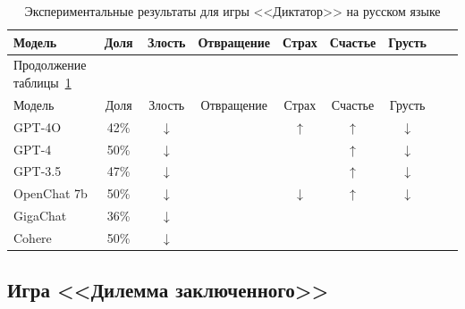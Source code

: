 \begin{longtable}[c]{|p{3.8cm}|c|c|c|c|c|c|c|c|}
\caption{Экспериментальные результаты для игры <<Диктатор>> на русском языке}
\label{tab:bargaining-ru}
    \\
    \hline
Модель & Доля & Злость & Отвращение & Страх  & Счастье & Грусть \\ \hline
    \endfirsthead   
    \multicolumn{2}{l}{\hspace{-2mm}Продолжение таблицы~\ref{tab:bargaining-ru}}        \\ %
\hline

Модель & Доля & Злость & Отвращение & Страх  & Счастье & Грусть \\ \hline \endhead        \hline %
    \endfoot        \hline
    \endlastfoot

GPT-4O & 42\% & $\downarrow$ & \bluearrow{$\downarrow$} & $\uparrow$ & $\uparrow$ & $\downarrow$ \\ \hline
GPT-4 & 50\% & $\downarrow$ & \bluearrow{$\downarrow$} & \bluearrow{$\uparrow$} & $\uparrow$ & $\downarrow$ \\ \hline

GPT-3.5 & 47\% & $\downarrow$ & \bluearrow{$\downarrow$} & \bluearrow{$\uparrow$} & $\uparrow$ & $\downarrow$ \\ \hline

OpenChat 7b & 50\% & $\downarrow$ & \bluearrow{$\downarrow$} & $\downarrow$ & $\uparrow$ & $\downarrow$ \\ \hline
GigaChat & 36\% & $\downarrow$ & \bluearrow{$\downarrow$} & \bluearrow{$\uparrow$} & \bluearrow{$\downarrow$} & \bluearrow{$\uparrow$} \\ \hline
Cohere & 50\% & $\downarrow$ & \bluearrow{$\downarrow$} & \bluearrow{$\uparrow$} & \bluearrow{$\downarrow$} & \bluearrow{$\uparrow$} \\ \hline
\end{longtable}

\subsection{Игра <<Дилемма заключенного>>}

